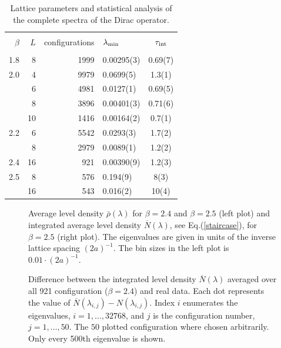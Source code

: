 \begin{small}
\begin{table}[!hb]
\begin{center}
   \begin{tabular}{rrrlc}
      \hline \\[-3mm]
$\beta$&$L$ &configurations&$\lambda_{\rm min}$&$\tau_{\rm int}$\\[1mm] \hline \\[-3mm]
      1.8 &  8   & 1999   &  0.00295(3) &  0.69(7)   \\
      2.0 &  4   & 9979   &  0.0699(5)  &  1.3(1)    \\
          &  6   & 4981   &  0.0127(1)  &  0.69(5)   \\
          &  8   & 3896   &  0.00401(3) &  0.71(6)   \\
          & 10   & 1416   &  0.00164(2) &   0.7(1)   \\
      2.2 &  6   & 5542   &  0.0293(3)  &   1.7(2)   \\
          &  8   & 2979   &  0.0089(1)  &   1.2(2)   \\
      2.4 &  16  &  921   &  0.00390(9) &  1.2(3)   \\
      2.5 &  8   &  576   &  0.194(9)   &  8(3)     \\
          & 16   &  543   &  0.016(2)   &  10(4)     \\[1mm] \hline
   \end{tabular}
\end{center}
   \caption{Lattice parameters and statistical analysis of the
     complete spectra of the Dirac operator.\label{tab1} }
\end{table}
\end{small}


\begin{figure}
\centerline{}
\caption{Average level density $\bar{\rho}(\lambda)$ for $\beta=2.4$
  and $\beta=2.5$ (left plot) and integrated average level density
  $\overline{N}(\lambda)$, see Eq.(\protect\ref{staircase}), for
  $\beta=2.5$ (right plot). The eigenvalues are given in units of the
  inverse lattice spacing $(2a)^{-1}$. The bin sizes in the left plot is
  $0.01\cdot(2a)^{-1}$.
\label{stair}}
\end{figure}

\begin{figure}
\centerline{}
\caption{ Difference between the integrated level density
  $\overline{N}(\lambda)$ averaged over all 921 configuration
  ($\beta=2.4$) and real data. Each dot represents the value of
  $\overline{N}(\lambda_{i,j})-N(\lambda_{i,j})$. Index $i$ enumerates
  the eigenvalues, $i=1,\ldots,32768$, and $j$ is the configuration
  number, $j=1,\ldots,50$. The $50$ plotted configuration where chosen
  arbitrarily. Only every 500th eigenvalue is shown.
\label{ensemble}}
\end{figure}

